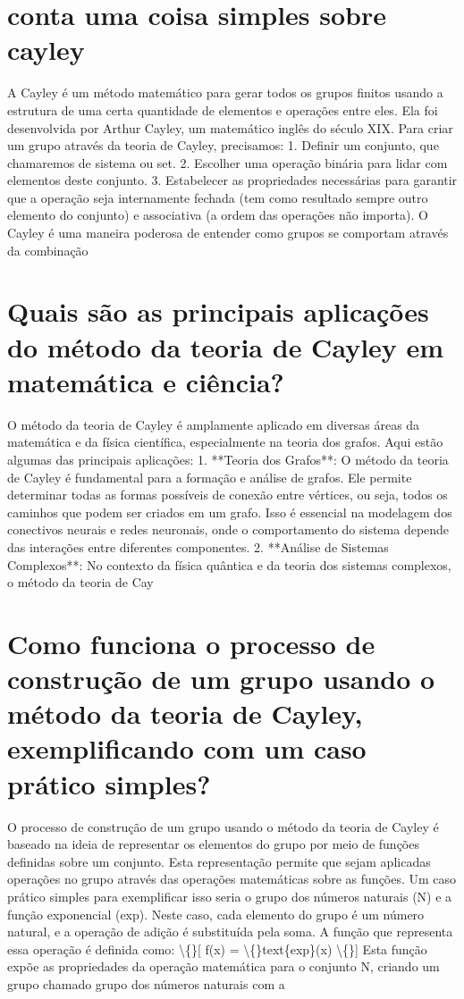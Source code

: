 \documentclass[11pt,a4paper]{article}
\begin{document}
\section{conta uma coisa simples sobre cayley}
A Cayley é um método matemático para gerar todos os grupos finitos usando a estrutura de uma certa quantidade de elementos e operações entre eles. Ela foi desenvolvida por Arthur Cayley, um matemático inglês do século XIX. Para criar um grupo através da teoria de Cayley, precisamos: 1. Definir um conjunto, que chamaremos de sistema ou set. 2. Escolher uma operação binária para lidar com elementos deste conjunto. 3. Estabelecer as propriedades necessárias para garantir que a operação seja internamente fechada (tem como resultado sempre outro elemento do conjunto) e associativa (a ordem das operações não importa). O Cayley é uma maneira poderosa de entender como grupos se comportam através da combinação

\section{Quais são as principais aplicações do método da teoria de Cayley em matemática e ciência?}
O método da teoria de Cayley é amplamente aplicado em diversas áreas da matemática e da física científica, especialmente na teoria dos grafos. Aqui estão algumas das principais aplicações: 1. **Teoria dos Grafos**: O método da teoria de Cayley é fundamental para a formação e análise de grafos. Ele permite determinar todas as formas possíveis de conexão entre vértices, ou seja, todos os caminhos que podem ser criados em um grafo. Isso é essencial na modelagem dos conectivos neurais e redes neuronais, onde o comportamento do sistema depende das interações entre diferentes componentes. 2. **Análise de Sistemas Complexos**: No contexto da física quântica e da teoria dos sistemas complexos, o método da teoria de Cay

\section{Como funciona o processo de construção de um grupo usando o método da teoria de Cayley, exemplificando com um caso prático simples?}
O processo de construção de um grupo usando o método da teoria de Cayley é baseado na ideia de representar os elementos do grupo por meio de funções definidas sobre um conjunto. Esta representação permite que sejam aplicadas operações no grupo através das operações matemáticas sobre as funções. Um caso prático simples para exemplificar isso seria o grupo dos números naturais (N) e a função exponencial (exp). Neste caso, cada elemento do grupo é um número natural, e a operação de adição é substituída pela soma. A função que representa essa operação é definida como: \textbackslash\{\}[ f(x) = \textbackslash\{\}text\{exp\}(x) \textbackslash\{\}] Esta função expõe as propriedades da operação matemática para o conjunto N, criando um grupo chamado grupo dos números naturais com a
\end{document}
